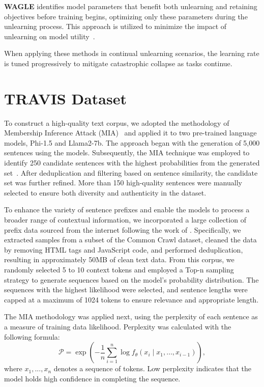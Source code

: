 \documentclass{article}
\theoremstyle{plain}
\theoremstyle{definition}
\theoremstyle{remark}
\begin{document}
\textbf{WAGLE} identifies model parameters that benefit both unlearning and retaining objectives before training begins, optimizing only these parameters during the unlearning process. This approach is utilized to minimize the impact of unlearning on model utility~\cite{DBLP:journals/corr/abs-2410-17509}.

When applying these methods in continual unlearning scenarios, the learning rate is tuned progressively to mitigate catastrophic collapse as tasks continue.

\section{TRAVIS Dataset}

To construct a high-quality text corpus, we adopted the methodology of Membership Inference Attack (MIA)~\cite{DBLP:conf/csfw/YeomGFJ18} and applied it to two pre-trained language models, Phi-1.5 and Llama2-7b.
The approach began with the generation of 5,000 sentences using the models.
Subsequently, the MIA technique was employed to identify 250 candidate sentences with the highest probabilities from the generated set~\cite{DBLP:conf/uss/CarliniTWJHLRBS21}.
After deduplication and filtering based on sentence similarity, the candidate set was further refined. More than 150 high-quality sentences were manually selected to ensure both diversity and authenticity in the dataset.

To enhance the variety of sentence prefixes and enable the models to process a broader range of contextual information, we incorporated a large collection of prefix data sourced from the internet following the work of \citet{DBLP:conf/uss/CarliniTWJHLRBS21}. Specifically, we extracted samples from a subset of the Common Crawl dataset, cleaned the data by removing HTML tags and JavaScript code, and performed deduplication, resulting in approximately 50MB of clean text data. From this corpus, we randomly selected 5 to 10 context tokens and employed a Top-n sampling strategy to generate sequences based on the model’s probability distribution. The sequences with the highest likelihood were selected, and sentence lengths were capped at a maximum of 1024 tokens to ensure relevance and appropriate length.

The MIA methodology was applied next, using the perplexity of each sentence as a measure of training data likelihood. Perplexity was calculated with the following formula:
\begin{equation}
	\mathcal{P} = \exp\left( -\frac{1}{n} \sum_{i=1}^n \log f_\theta(x_i \mid x_1, \dots, x_{i-1}) \right),
\end{equation}
where $x_1,...,x_n$ denotes a sequence of tokens. Low perplexity indicates that the model holds high confidence in completing the sequence.
\end{document}

